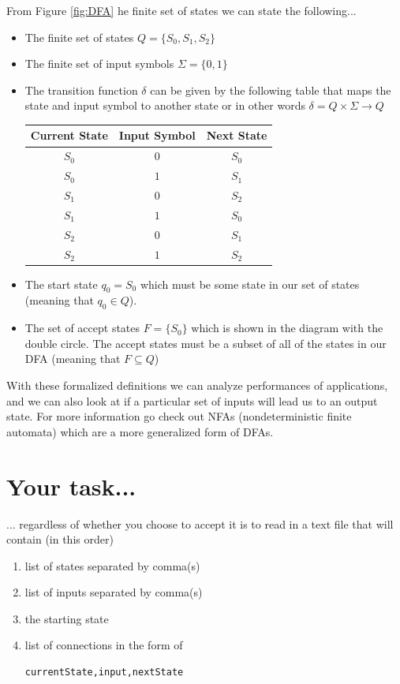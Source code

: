 \documentclass{article}
\begin{document}
From Figure \ref{fig:DFA} he finite set of states we can state the following...
\begin{itemize}
\item The finite set of states $Q = \{S_0, S_1, S_2\}$
\item The finite set of input symbols $\Sigma = \{0,1\}$
\item The transition function $\delta$ can be given by the following table that maps the state and input symbol to another state or in other words $\delta = Q \times \Sigma \rightarrow Q$
\begin{center}
\begin{tabular}{|c|c|c|}
\hline 
Current State & Input Symbol & Next State \\ 
\hline 
$S_0$ & $0$ & $S_0$ \\ 
\hline 
$S_0$ & $1$ & $S_1$ \\ 
\hline 
$S_1$ & $0$ & $S_2$ \\ 
\hline 
$S_1$ & $1$ & $S_0$ \\ 
\hline 
$S_2$ & $0$ & $S_1$ \\ 
\hline 
$S_2$ & $1$ & $S_2$ \\ 
\hline 
\end{tabular} 
\end{center}

\item The start state $q_0 = S_0$ which must be some state in our set of states (meaning that $q_0 \in Q$).
\item The set of accept states $F = \{S_0\}$ which is shown in the diagram with the double circle. The accept states must be a subset of all of the states in our DFA (meaning that $F \subseteq Q$)
\end{itemize} 

With these formalized definitions we can analyze performances of applications, and we can also look at if a particular set of inputs will lead us to an output state. For more information go check out NFAs (nondeterministic finite automata) which are a more generalized form of DFAs.

\section{Your task...}
... regardless of whether you choose to accept it is to read in a text file that will contain (in this order)

\begin{enumerate}
\item list of states separated by comma(s)
\item list of inputs separated by comma(s)
\item the starting state
\item list of connections in the form of \begin{verbatim}
currentState,input,nextState
\end{verbatim}
\end{enumerate}
\end{document}
